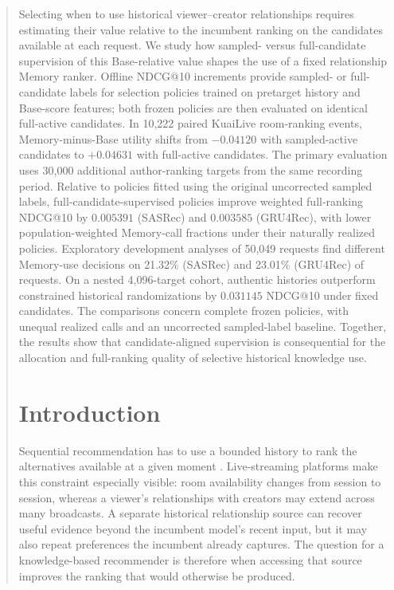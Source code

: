 
\begin{abstract}
Selecting when to use historical viewer--creator relationships requires estimating their value relative to the incumbent ranking on the candidates available at each request. We study how sampled- versus full-candidate supervision of this Base-relative value shapes the use of a fixed relationship Memory ranker. Offline NDCG@10 increments provide sampled- or full-candidate labels for selection policies trained on pretarget history and Base-score features; both frozen policies are then evaluated on identical full-active candidates. In 10,222 paired KuaiLive room-ranking events, Memory-minus-Base utility shifts from $-0.04120$ with sampled-active candidates to $+0.04631$ with full-active candidates. The primary evaluation uses 30,000 additional author-ranking targets from the same recording period. Relative to policies fitted using the original uncorrected sampled labels, full-candidate-supervised policies improve weighted full-ranking NDCG@10 by $0.005391$ (SASRec) and $0.003585$ (GRU4Rec), with lower population-weighted Memory-call fractions under their naturally realized policies. Exploratory development analyses of 50,049 requests find different Memory-use decisions on 21.32\% (SASRec) and 23.01\% (GRU4Rec) of requests. On a nested 4,096-target cohort, authentic histories outperform constrained historical randomizations by $0.031145$ NDCG@10 under fixed candidates. The comparisons concern complete frozen policies, with unequal realized calls and an uncorrected sampled-label baseline. Together, the results show that candidate-aligned supervision is consequential for the allocation and full-ranking quality of selective historical knowledge use.


\section{Introduction}

Sequential recommendation has to use a bounded history to rank the alternatives available at a given moment \cite{kang2018sasrec,sun2019bert4rec}. Live-streaming platforms make this constraint especially visible: room availability changes from session to session, whereas a viewer's relationships with creators may extend across many broadcasts. A separate historical relationship source can recover useful evidence beyond the incumbent model's recent input, but it may also repeat preferences the incumbent already captures. The question for a knowledge-based recommender is therefore when accessing that source improves the ranking that would otherwise be produced.


\end{abstract}
